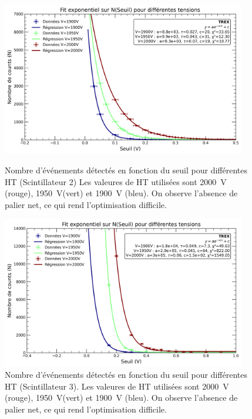 \documentclass[a4paper,12pt,twoside]{article}
\begin{document}
\begin{figure}[H]
  \begin{minipage}{0.49\textwidth}
    \centering
    \includegraphics[width=0.95\textwidth]{Images/Threshold_Scintillateur_2.png}
    \caption{Nombre d’événements détectés en fonction du seuil pour différentes HT (Scintillateur 2)
    Les valeures de HT utilisées sont 2000~V (rouge), 1950~V(vert) et 1900~V (bleu).
    On observe l'absence de palier net, ce qui rend l'optimisation difficile.}
    \label{fig:optimisation_scint2}
  \end{minipage}
  \hfill
  \begin{minipage}{0.49\textwidth}
    \centering
    \includegraphics[width=0.95\textwidth]{Images/Threshold_Scintillateur_3.png}
    \caption{Nombre d’événements détectés en fonction du seuil pour différentes HT (Scintillateur 3).
    Les valeures de HT utilisées sont 2000~V (rouge), 1950~V(vert) et 1900~V (bleu).
    On observe l'absence de palier net, ce qui rend l'optimisation difficile.}
    \label{fig:optimisation_scint3}
  \end{minipage}
\end{figure}
\end{document}
